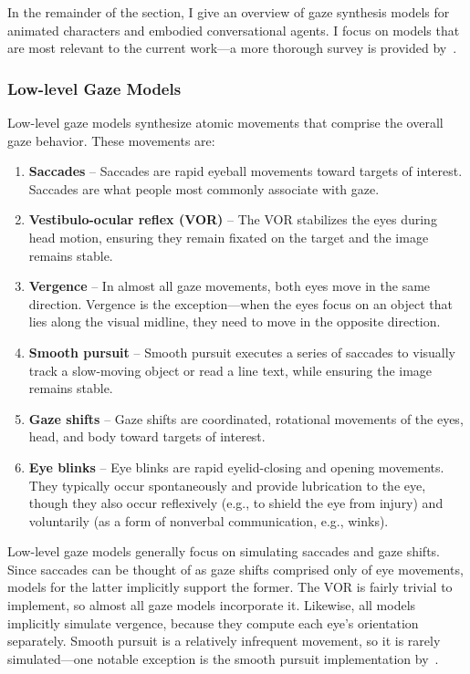 In the remainder of the section, I give an overview of gaze synthesis models for animated characters and embodied conversational agents. I focus on models that are most relevant to the current work---a more thorough survey is provided by~\citet{ruhland2015gazereview}.

\subsubsection{Low-level Gaze Models}

Low-level gaze models synthesize atomic movements that comprise the overall gaze behavior. These movements are:

\begin{enumerate}
\item \textbf{Saccades} -- Saccades are rapid eyeball movements toward targets of interest. Saccades are what people most commonly associate with gaze.
\item \textbf{Vestibulo-ocular reflex (VOR)} -- The VOR stabilizes the eyes during head motion, ensuring they remain fixated on the target and the image remains stable.
\item \textbf{Vergence} -- In almost all gaze movements, both eyes move in the same direction. Vergence is the exception---when the eyes focus on an object that lies along the visual midline, they need to move in the opposite direction.
\item \textbf{Smooth pursuit} -- Smooth pursuit executes a series of saccades to visually track a slow-moving object or read a line text, while ensuring the image remains stable.
\item \textbf{Gaze shifts} -- Gaze shifts are coordinated, rotational movements of the eyes, head, and body toward targets of interest.
\item \textbf{Eye blinks} -- Eye blinks are rapid eyelid-closing and opening movements. They typically occur spontaneously and provide lubrication to the eye, though they also occur reflexively (e.g., to shield the eye from injury) and voluntarily (as a form of nonverbal communication, e.g., winks).
\end{enumerate}

Low-level gaze models generally focus on simulating saccades and gaze shifts. Since saccades can be thought of as gaze shifts comprised only of eye movements, models for the latter implicitly support the former. The VOR is fairly trivial to implement, so almost all gaze models incorporate it. Likewise, all models implicitly simulate vergence, because they compute each eye's orientation separately. Smooth pursuit is a relatively infrequent movement, so it is rarely simulated---one notable exception is the smooth pursuit implementation by~\citet{yeo2012eyecatch}.

